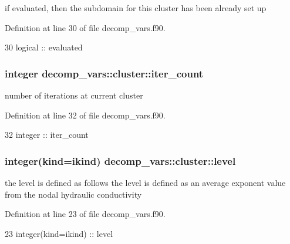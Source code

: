 if evaluated, then the subdomain for this cluster has been already set up 



Definition at line 30 of file decomp\+\_\+vars.\+f90.


\begin{DoxyCode}
30     \textcolor{keywordtype}{logical} :: evaluated
\end{DoxyCode}
\subsubsection[{iter\+\_\+count}]{\setlength{\rightskip}{0pt plus 5cm}integer decomp\+\_\+vars\+::cluster\+::iter\+\_\+count\hspace{0.3cm}{\ttfamily [private]}}\label{structdecomp__vars_1_1cluster_a2e2ce50aa1a39238e672f79bb7ed4c9d}


number of iterations at current cluster 



Definition at line 32 of file decomp\+\_\+vars.\+f90.


\begin{DoxyCode}
32     \textcolor{keywordtype}{integer} :: iter\_count
\end{DoxyCode}
\subsubsection[{level}]{\setlength{\rightskip}{0pt plus 5cm}integer(kind=ikind) decomp\+\_\+vars\+::cluster\+::level\hspace{0.3cm}{\ttfamily [private]}}\label{structdecomp__vars_1_1cluster_a245e4e2b507919299b6b0078e7ca6e44}


the level is defined as follows the level is defined as an average exponent value from the nodal hydraulic conductivity 



Definition at line 23 of file decomp\+\_\+vars.\+f90.


\begin{DoxyCode}
23     \textcolor{keywordtype}{integer(kind=ikind)}   :: level
\end{DoxyCode}
